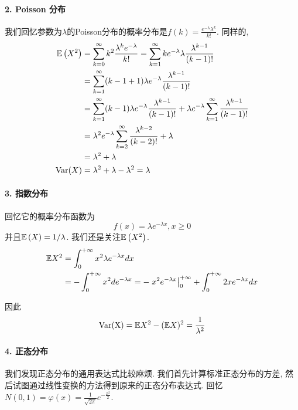     \paragraph{2. Poisson 分布} 我们回忆参数为$\lambda$的Poisson分布的概率分布是$f(k )=\frac{e^{-\lambda} \lambda^k}{k !}$. 同样的, 
    $$
    \begin{aligned}
    \mathbb E\left(X^2\right) & =\sum_{k=0}^{\infty} k^2 \frac{\lambda^k e^{-\lambda}}{k !}=\sum_{k=1}^{\infty} k e^{-\lambda} \lambda \frac{\lambda^{k-1}}{(k-1) !} \\
    & =\sum_{k=1}^{\infty}(k-1+1) \lambda e^{-\lambda} \frac{\lambda^{k-1}}{(k-1) !} \\
    & =\sum_{k=1}^{\infty}(k-1) \lambda e^{-\lambda} \frac{\lambda^{k-1}}{(k-1) !}+\lambda e^{-\lambda} \sum_{k=1}^{\infty} \frac{\lambda^{k-1}}{(k-1) !} \\
    & =\lambda^2 e^{-\lambda} \sum_{k=2}^{\infty} \frac{\lambda^{k-2}}{(k-2) !}+\lambda \\
    & =\lambda^2+\lambda \\
    \operatorname{Var}(X) & =\lambda^2+\lambda-\lambda^2=\lambda
    \end{aligned}
    $$

    \paragraph{3. 指数分布} 回忆它的概率分布函数为$$
    f(x)=\lambda e^{-\lambda x}, x \geq 0
    $$并且$\mathbb E\left(X\right)=1/\lambda$. 我们还是关注$\mathbb E\left(X^2\right)$. 
    $$
\begin{aligned}
\mathbb E X^2 & =\int_0^{+\infty} x^2 \lambda e^{-\lambda x} d x \\
& =-\int_0^{+\infty} x^2 d e^{-\lambda x}=-\left.x^2 e^{-\lambda x}\right|_0 ^{+\infty}+\int_0^{+\infty} 2 x e^{-\lambda x} d x 
\end{aligned}
$$

因此
$$
\operatorname{Var}(\mathrm{X})=\mathbb E X^2-(\mathbb E X)^2=\frac{1}{\lambda^2}
$$

\paragraph{4. 正态分布} 我们发现正态分布的通用表达式比较麻烦. 我们首先计算标准正态分布的方差, 然后试图通过线性变换的方法得到原来的正态分布表达式. 回忆$N(0,1)=\varphi(x)=\frac{1}{\sqrt{2 \pi}} e^{-\frac{x^2}{2}}$. 

